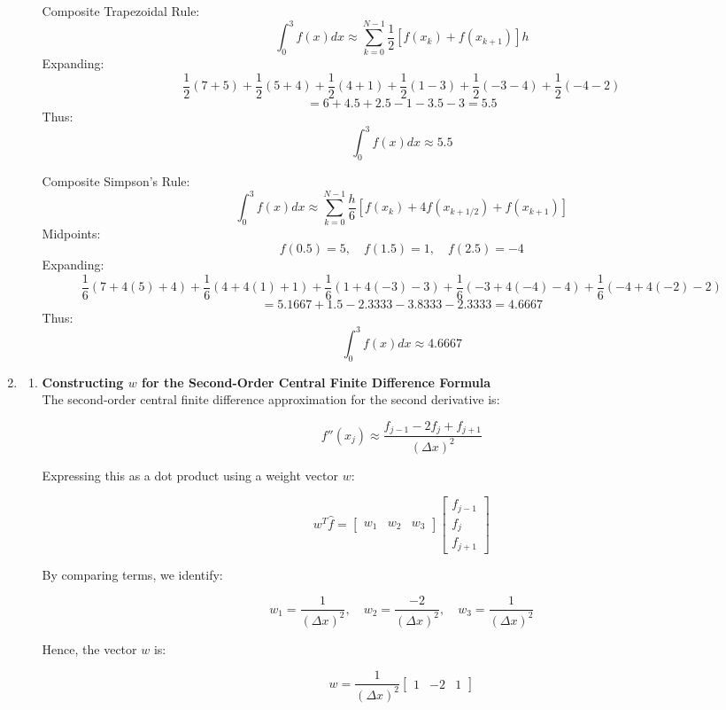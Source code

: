\documentclass[12pt]{article}
\begin{document}
\begin{enumerate}
\begin{enumerate}
    Composite Trapezoidal Rule:
    \[
    \int_0^3 f(x)dx \approx \sum_{k=0}^{N-1} \frac{1}{2} \left[ f(x_k) + f(x_{k+1}) \right] h
    \]
    Expanding:
    \[
    \frac{1}{2} (7 + 5) + \frac{1}{2} (5 + 4) + \frac{1}{2} (4 + 1) + \frac{1}{2} (1 - 3) + \frac{1}{2} (-3 - 4) + \frac{1}{2} (-4 - 2)
    \]
    \[
    = 6 + 4.5 + 2.5 - 1 - 3.5 - 3 = 5.5
    \]
    Thus:
    \[
    \int_0^3 f(x)dx \approx 5.5
    \]

    Composite Simpson’s Rule:
    \[
    \int_0^3 f(x)dx \approx \sum_{k=0}^{N-1} \frac{h}{6} \left[ f(x_k) + 4f(x_{k+1/2}) + f(x_{k+1}) \right]
    \]
    Midpoints:
    \[
    f(0.5) = 5, \quad f(1.5) = 1, \quad f(2.5) = -4
    \]
    Expanding:
    \[
    \frac{1}{6} (7 + 4(5) + 4) + \frac{1}{6} (4 + 4(1) + 1) + \frac{1}{6} (1 + 4(-3) - 3) + \frac{1}{6} (-3 + 4(-4) - 4) + \frac{1}{6} (-4 + 4(-2) - 2)
    \]
    \[
    = 5.1667 + 1.5 - 2.3333 - 3.8333 - 2.3333 = 4.6667
    \]
    Thus:
    \[
    \int_0^3 f(x)dx \approx 4.6667
    \]
\end{enumerate}

\item 
\begin{enumerate}
    \item \textbf{Constructing \( w \) for the Second-Order Central Finite Difference Formula} \\
    The second-order central finite difference approximation for the second derivative is:

    \[
    f''(x_j) \approx \frac{f_{j-1} - 2f_j + f_{j+1}}{(\Delta x)^2}
    \]

    Expressing this as a dot product using a weight vector \( w \):

    \[
    w^T \hat{f} = \begin{bmatrix} w_1 & w_2 & w_3 \end{bmatrix}
    \begin{bmatrix} f_{j-1} \\ f_j \\ f_{j+1} \end{bmatrix}
    \]

    By comparing terms, we identify:

    \[
    w_1 = \frac{1}{(\Delta x)^2}, \quad w_2 = \frac{-2}{(\Delta x)^2}, \quad w_3 = \frac{1}{(\Delta x)^2}
    \]

    Hence, the vector \( w \) is:

    \[
    w = \frac{1}{(\Delta x)^2} \begin{bmatrix} 1 & -2 & 1 \end{bmatrix}
    \]


\end{enumerate}
\end{enumerate}
\end{document}
